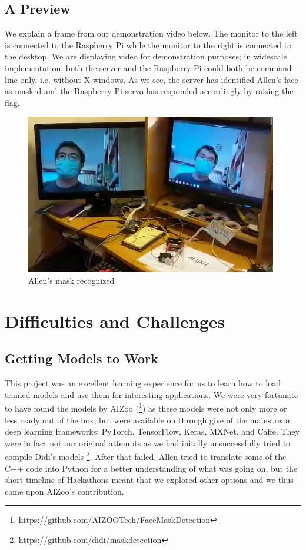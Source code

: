 \documentclass[conference, 12pt, onecolumn]{IEEEtran}
\begin{document}
\subsection{A Preview}
We explain a frame from our demonstration video below. The monitor to the left is connected to the Raspberry Pi while the monitor to the right is connected to the desktop. We are displaying video for demonstration purposes; in widescale implementation, both the server and the Raspberry Pi could both be command-line only, i.e. without X-windows. As we see, the server has identified Allen's face as masked and the Raspberry Pi servo has responded accordingly by raising the flag.
\begin{figure}[h!]
\centering
\includegraphics[scale=.5]{cropped}
\captionsetup{labelformat=empty}
\caption{Allen's mask recognized}
\end{figure}

\section{Difficulties and Challenges}
\subsection{Getting Models to Work}
This project was an excellent learning experience for us to learn how to load trained models and use them for interesting applications. We were very fortunate to have found the models by AIZoo (\footnote{\url{https://github.com/AIZOOTech/FaceMaskDetection}}) as these models were not only more or less ready out of the box, but were available on through give of the mainstream deep learning frameworks: PyTorch, TensorFlow, Keras, MXNet, and Caffe. They were in fact not our original attempts as we had initally unsuccessfully tried to compile Didi's models \footnote{\url{https://github.com/didi/maskdetection}}. After that failed, Allen tried to translate some of the C++ code into Python for a better understanding of what was going on, but the short timeline of Hackathons meant that we explored other options and we thus came upon AIZoo's contribution. 
\end{document}
